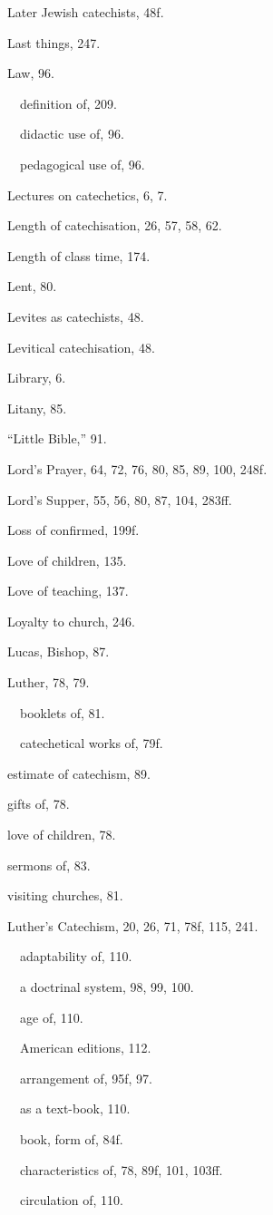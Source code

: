 \begin{originalinhalt}
Later Jewish catechists, 48f.

Last things, 247.

Law, 96.

 definition of, 209.

 didactic use of, 96.

 pedagogical use of, 96.

Lectures on catechetics, 6, 7.

Length of catechisation, 26, 57, 58, 62.

Length of class time, 174.

Lent, 80.

Levites as catechists, 48.

Levitical catechisation, 48.

Library, 6.

Litany, 85.

“Little Bible,” 91.

Lord’s Prayer, 64, 72, 76, 80, 85, 89, 100, 248f.

Lord’s Supper, 55, 56, 80, 87, 104, 283ff.

Loss of confirmed, 199f.

Love of children, 135.

Love of teaching, 137.

Loyalty to church, 246.

Lucas, Bishop, 87.

Luther, 78, 79.

 booklets of, 81.

 catechetical works of, 79f.

estimate of catechism, 89.

gifts of, 78.

love of children, 78.

sermons of, 83.

visiting churches, 81.

Luther’s Catechism, 20, 26, 71, 78f, 115, 241.

 adaptability of, 110.

 a doctrinal system, 98, 99, 100.

 age of, 110.

 American editions, 112.

 arrangement of, 95f, 97.

 as a text-book, 110.

 book, form of, 84f.

 characteristics of, 78, 89f, 101, 103ff.

 circulation of, 110.


\end{originalinhalt}
